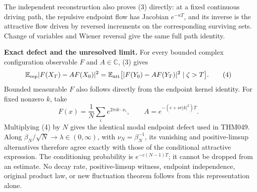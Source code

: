 \documentclass[11pt]{article}
\newcommand{\E}{\mathbb E}
\begin{document}
The independent reconstruction also proves (3) directly: at a fixed continuous driving path, the repulsive endpoint flow has Jacobian $e^{-\kappa T}$, and its inverse is the attractive flow driven by reversed increments on the corresponding surviving sets. Change of variables and Wiener reversal give the same full path identity.

\noindent\textbf{Exact defect and the unresolved limit.}
For every bounded complex configuration observable $F$ and $A\in\mathbb C$, (3) gives
\[
 \E_{\rm rep}|F(X_T)-AF(X_0)|^2
 =\E_{\rm att}\bigl[|F(Y_0)-AF(Y_T)|^2\mid\zeta>T\bigr].\tag{4}
\]
Bounded measurable $F$ also follows directly from the endpoint kernel identity. For fixed nonzero $k$, take
\[
 F(x)=\frac1N\sum_i e^{2\pi i k\cdot x_i},\qquad
 A=e^{-(c+\nu c|k|^2)T}.
\]
Multiplying (4) by $N$ gives the identical modal endpoint defect used in THM049. Along $\beta_N/\sqrt N\to\lambda\in(0,\infty)$, with $\nu_N=\beta_N^{-1}$, its vanishing and positive-limsup alternatives therefore agree exactly with those of the conditional attractive expression. The conditioning probability is $e^{-c(N-1)T}$; it cannot be dropped from an estimate. No decay rate, positive-limsup witness, endpoint independence, original product law, or new fluctuation theorem follows from this representation alone.
\end{document}
